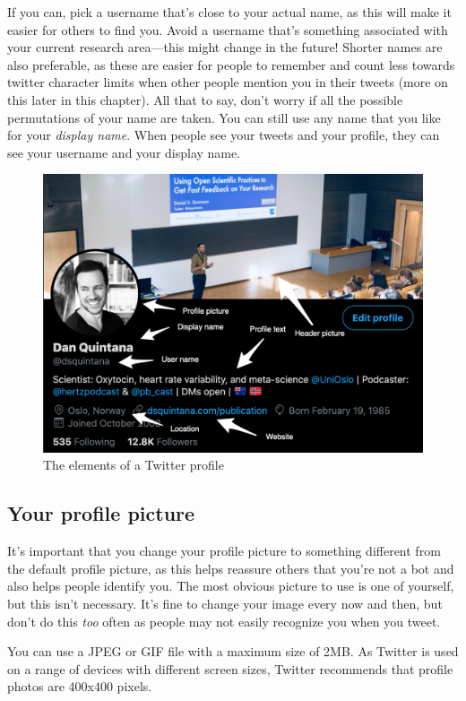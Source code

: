 \documentclass[]{book}
\begin{document}
If you can, pick a username that's close to your actual name, as this will make it easier for others to find you. Avoid a username that's something associated with your current research area---this might change in the future! Shorter names are also preferable, as these are easier for people to remember and count less towards twitter character limits when other people mention you in their tweets (more on this later in this chapter). All that to say, don't worry if all the possible permutations of your name are taken. You can still use any name that you like for your \emph{display name}. When people see your tweets and your profile, they can see your username and your display name.

\begin{figure}

\includegraphics[width=0.8\linewidth]{images/profile} \hfill{}

\caption{The elements of a Twitter profile}\label{fig:unnamed-chunk-1}
\end{figure}

\hypertarget{your-profile-picture}{%
\subsection{Your profile picture}\label{your-profile-picture}}

It's important that you change your profile picture to something different from the default profile picture, as this helps reassure others that you're not a bot and also helps people identify you. The most obvious picture to use is one of yourself, but this isn't necessary. It's fine to change your image every now and then, but don't do this \emph{too} often as people may not easily recognize you when you tweet.

You can use a JPEG or GIF file with a maximum size of 2MB. As Twitter is used on a range of devices with different screen sizes, Twitter recommends that profile photos are 400x400 pixels.
\end{document}
